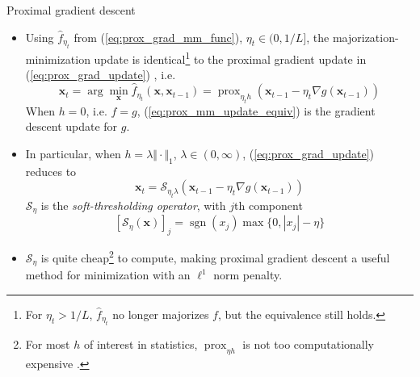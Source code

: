 \documentclass{beamer}
\numberwithin{equation}{section}
\newcommand{\aref}[1]{\alert{\ref{#1}}}
\begin{document}
\begin{frame}{Proximal gradient descent}
    \begin{itemize}
        \item
        Using $ \hat{f}_{\eta_t} $ from (\aref{eq:prox_grad_mm_func}),
        $ \eta_t \in (0, 1 / L] $, the majorization-minimization update is
        identical\footnote{
            For $ \eta_t > 1 / L $, $ \hat{f}_{\eta_t} $ no longer majorizes
            $ f $, but the equivalence still holds.
        } to the proximal gradient update in (\aref{eq:prox_grad_update})
        \cite{prox_algos}, i.e.
        \begin{equation} \label{eq:prox_mm_update_equiv}
            \mathbf{x}_t = \arg\min_\mathbf{x}
            \hat{f}_{\eta_t}(\mathbf{x}, \mathbf{x}_{t - 1}) =
            \operatorname{prox}_{\eta_t h}(\mathbf{x}_{t - 1} -
            \eta_t\nabla g(\mathbf{x}_{t - 1}))
        \end{equation}
        When $ h = 0 $, i.e. $ f = g $, (\aref{eq:prox_mm_update_equiv}) is
        the gradient descent update for $ g $.

        \item
        In particular, when $ h = \lambda\Vert\cdot\Vert_1 $,
        $ \lambda \in (0, \infty) $, (\aref{eq:prox_grad_update}) reduces to
        \begin{equation} \label{eq:prox_grad_update_l1}
            \mathbf{x}_t = \mathcal{S}_{\eta_t\lambda}(\mathbf{x}_{t - 1} -
            \eta_t\nabla g(\mathbf{x}_{t - 1}))
        \end{equation}
        $ \mathcal{S}_\eta $ is the \textit{soft-thresholding operator}, with
        $ j $th component \cite{stat_learn_sparsity}
        \begin{equation} \label{eq:soft_threshold}
            [\mathcal{S}_\eta(\mathbf{x})]_j =
            \operatorname{sgn}(x_j)\max\{0, |x_j| - \eta\}        
        \end{equation}

        \item
        $ \mathcal{S}_\eta $ is quite cheap\footnote{
            For most $ h $ of interest in statistics,
            $ \operatorname{prox}_{\eta h} $ is not too computationally
            expensive \cite{stat_learn_sparsity}.
        } to compute, making proximal gradient descent a useful method for
        minimization with an $ \ell^1 $ norm penalty.
    \end{itemize}

    \bigskip
\end{frame}
\end{document}

